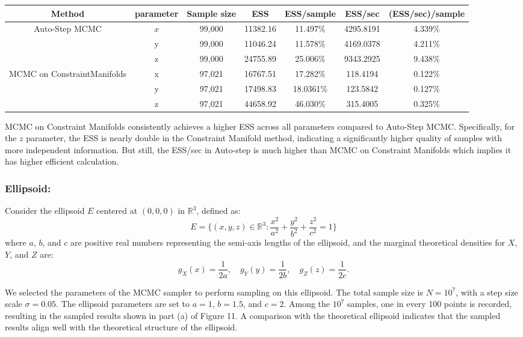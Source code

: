 \documentclass{article}
\begin{document}
\begin{center}
\begin{tabular}{ |c|c|c|c|c|c|c| } 
\hline
Method & parameter &Sample size& ESS & ESS/sample & ESS/sec & (ESS/sec)/sample  \\
\hline
\multirow{3}{5em}{Auto-Step MCMC} & $x $& 99,000 & 11382.16 & 11.497\% & 4295.8191 & 4.339\%\\ 

&y & 99,000 & 11046.24 & 11.578\% & 4169.0378 & 4.211\% \\

&z & 99,000 & 24755.89 & 25.006\% & 9343.2925 &  9.438\%\\
\hline
\multirow{2}{9em}{MCMC on ConstraintManifolds} & x & 97,021 & 16767.51 & 17.282\% & 118.4194 & 0.122\%\\

& y & 97,021 & 17498.83 & 18.0361\% & 123.5842 & 0.127\% \\ 
&z & 97,021 & 44658.92 & 46.030\% & 315.4005 & 0.325\%\\


\hline
\hline
\end{tabular}
\end{center}
MCMC on Constraint Manifolds consistently achieves a higher ESS across all parameters compared to Auto-Step MCMC. Specifically, for the $z$ parameter, the ESS is nearly double in the Constraint Manifold method, indicating a significantly higher quality of samples with more independent information. But still, the ESS/sec in Auto-step is much higher than MCMC on Constraint Manifolds which implies it has higher efficient calculation.


\subsubsection{Ellipsoid:}

Consider the ellipsoid \(E\) centered at \((0, 0, 0)\) in \(\mathbb{R}^3\), defined as:
\[
E = \{(x, y, z) \in \mathbb{R}^3 : \frac{x^2}{a^2} + \frac{y^2}{b^2} + \frac{z^2}{c^2} = 1\}
\]
where \(a\), \(b\), and \(c\) are positive real numbers representing the semi-axis lengths of the ellipsoid, and the marginal theoretical densities for \(X\), \(Y\), and \(Z\) are:
\[
g_X(x) = \frac{1}{2a}, \quad g_Y(y) = \frac{1}{2b}, \quad g_Z(z) = \frac{1}{2c}.
\]

We selected the parameters of the MCMC sampler to perform sampling on this ellipsoid. The total sample size is \(N = 10^7\), with a step size scale \(\sigma = 0.05\). The ellipsoid parameters are set to \(a = 1\), \(b = 1.5\), and \(c = 2\). Among the \(10^7\) samples, one in every 100 points is recorded, resulting in the sampled results shown in part (a) of Figure 11. A comparison with the theoretical ellipsoid indicates that the sampled results align well with the theoretical structure of the ellipsoid.
\end{document}
